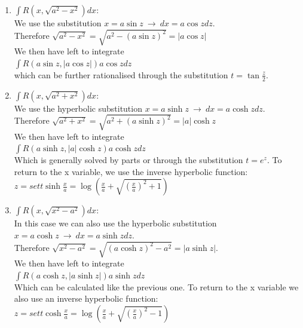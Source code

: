\documentclass[a4paper]{report}
\begin{document}
\begin{enumerate}
    \item $\int R\left(x,\sqrt{a^{2}-x^{2}} \right)dx $: \\
    We use the substitution $ x = a \sin z \ \rightarrow \ dx = a \cos z dz $.\\
    Therefore $\sqrt{a^{2}-x^{2}} = \sqrt{a^{2} - \left(a \sin z\right)^{2} } = \left\lvert a \cos z\right\rvert  $\\
    We then have left to integrate \\ $\int R\left(a \sin z, \left\lvert a \cos z\right\rvert \right)a \cos z dz $ \\ which can be further rationalised through the substitution $ t = \tan \frac{z}{2} $.
    \item $\int R\left(x,\sqrt{a^{2} + x^{2}} \right)dx $: \\
    We use the hyperbolic substitution $ x = a \sinh z \ \rightarrow \ dx = a \cosh z dz $.\\
    Therefore $ \sqrt{a^{2} + x^{2}} = \sqrt{a^{2} + \left(a \sinh z\right)^{2} } = \left\lvert a\right\rvert \cosh z $\\
    We then have left to integrate \\ $ \int R\left( a \sinh z, \left\lvert a\right\rvert \cosh z  \right) a \cosh z dz $\\
    Which is generally solved by parts or through the substitution $t = e^{z}$. To return to the x variable, we use the inverse hyperbolic function:\\
    $z =  sett \sinh \frac{x}{a} = \log \left(\frac{x}{a} + \sqrt{\left(\frac{x}{a} \right)^{2} + 1}  \right)  $
    \item $ \int R\left(x, \sqrt{x^{2} - a^{2}} \right)dx $: \\
    In this case we can also use the hyperbolic substitution $x = a \cosh z \ \rightarrow \ dx = a \sinh z dz$.\\
    Therefore $ \sqrt{x^{2} - a^{2} } = \sqrt{\left(a \cosh z\right)^{2} - a^{2} } = \left\lvert a \sinh z\right\rvert $.\\
    We then have left to integrate\\
    $ \int R\left(a \cosh z, \left\lvert a \sinh z\right\rvert \right)a \sinh z dz $\\
    Which can be calculated like the previous one. To return to the x variable we also use an inverse hyperbolic function:\\
    $z = sett \cosh \frac{x}{a} = \log \left(\frac{x}{a} + \sqrt{\left(\frac{x}{a} \right)^{2} - 1 }  \right) $
\end{enumerate}
\end{document}
